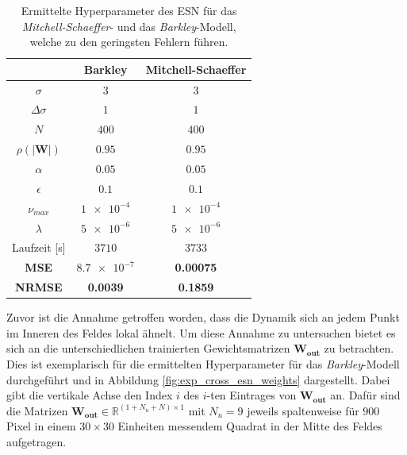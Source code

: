 \begin{table}[h]
	\centering
	\captionsetup{width=0.9\linewidth}
	\begin{tabular}{ccc}
		\hline		
		\multicolumn{1}{c}{} &  Barkley & Mitchell-Schaeffer \\ 
		\hline 
		\rule[-1ex]{0pt}{2.5ex} $\sigma$ & $3$ & $3$ \\ 
		\rule[-1ex]{0pt}{2.5ex} $\Delta \sigma$ & $1$ & $1$ \\ 
		\rule[-1ex]{0pt}{3.5ex} $N$ & $400$ & $400$ \\ 
		\rule[-1ex]{0pt}{3.5ex} $\rho(|\mathbf{W}|)$ & $0.95$ & $0.95$\\ 
		\rule[-1ex]{0pt}{3.5ex} $\alpha$ & $0.05$ & $0.05$ \\ 
		\rule[-1ex]{0pt}{3.5ex} $\epsilon$ & $0.1$ & $0.1$ \\ 
		\rule[-1ex]{0pt}{3.5ex} $\nu_{max}$ & $\num{1e-4}$ & $\num{1e-4}$\\ 
		\rule[-1ex]{0pt}{3.5ex} $\lambda$ & $\num{5e-6}$ & $\num{5e-6}$\\ 
		\rule[-1ex]{0pt}{2.5ex} Laufzeit [s] & $3710$ & $3733$ \\ 
		\rule[-1ex]{0pt}{2.5ex} \textbf{MSE} & \textbf{$\num{8.7e-7}$} & \textbf{0.00075} \\ 
		\rule[-1ex]{0pt}{2.5ex} \textbf{NRMSE} & \textbf{0.0039} & \textbf{0.1859} \\ 
		\hline 
	\end{tabular} 
	\caption{Ermittelte Hyperparameter des \textsc{ESN} für das \textit{Mitchell-Schaeffer}- und das \textit{Barkley}-Modell, welche zu den geringsten Fehlern führen.}
	\label{tab:exp_cross_esn_results}
\end{table}

Zuvor ist die Annahme getroffen worden, dass die Dynamik sich an jedem Punkt im Inneren des Feldes lokal ähnelt. Um diese Annahme zu untersuchen bietet es sich an die unterschiedlichen trainierten Gewichtsmatrizen $\mathbf{W_{out}}$ zu betrachten. Dies ist exemplarisch für die ermittelten Hyperparameter für das \textit{Barkley}-Modell durchgeführt und in Abbildung \ref{fig:exp_cross_esn_weights} dargestellt. Dabei gibt die vertikale Achse den Index $i$ des $i$-ten Eintrages von $\mathbf{W_{out}}$ an. Dafür sind die Matrizen $\mathbf{W_{out}} \in \mathbb{R}^{(1 + N_u + N) \times 1}$ mit $N_u = 9$ jeweils spaltenweise für $900$ Pixel in einem $30 \times 30$ Einheiten messendem Quadrat in der Mitte des Feldes aufgetragen.

